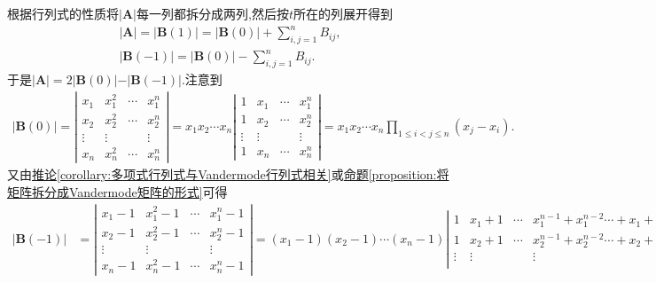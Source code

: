 \documentclass[../../main.tex]{subfiles}
\begin{document}
\begin{solution}
根据行列式的性质将\(\vert\boldsymbol{A}\vert\)每一列都拆分成两列,然后按\(t\)所在的列展开得到
\begin{gather*}
\vert\boldsymbol{A}\vert=\vert\boldsymbol{B}(1)\vert=\vert\boldsymbol{B}(0)\vert+\sum_{i,j = 1}^{n}B_{ij},
\\
\vert\boldsymbol{B}(-1)\vert=\vert\boldsymbol{B}(0)\vert-\sum_{i,j = 1}^{n}B_{ij}.
\end{gather*}
于是\(\vert\boldsymbol{A}\vert = 2\vert\boldsymbol{B}(0)\vert - \vert\boldsymbol{B}(-1)\vert\).注意到
\begin{align*}
\vert\boldsymbol{B}(0)\vert=\left|\begin{matrix}
x_1 & x_{1}^{2} & \cdots & x_{1}^{n}\\
x_2 & x_{2}^{2} & \cdots & x_{2}^{n}\\
\vdots & \vdots &  & \vdots\\
x_n & x_{n}^{2} & \cdots & x_{n}^{n}
\end{matrix}\right|=x_1x_2\cdots x_n\left|\begin{matrix}
1 & x_1 & \cdots & x_{1}^{n}\\
1 & x_2 & \cdots & x_{2}^{n}\\
\vdots & \vdots &  & \vdots\\
1 & x_n & \cdots & x_{n}^{n}
\end{matrix}\right|=x_1x_2\cdots x_n\prod_{1\leqslant i < j\leqslant n}(x_j - x_i). 
\end{align*}
又由\hyperref[corollary:多项式行列式与Vandermode行列式相关]{推论\ref{corollary:多项式行列式与Vandermode行列式相关}}或\hyperref[proposition:将矩阵拆分成Vandermode矩阵的形式]{命题\ref{proposition:将矩阵拆分成Vandermode矩阵的形式}}可得
\begin{align*}
\vert\boldsymbol{B}(-1)\vert&=\left|\begin{matrix}
x_1 - 1 & x_{1}^{2} - 1 & \cdots & x_{1}^{n} - 1\\
x_2 - 1 & x_{2}^{2} - 1 & \cdots & x_{2}^{n} - 1\\
\vdots & \vdots &  & \vdots\\
x_n - 1 & x_{n}^{2} - 1 & \cdots & x_{n}^{n} - 1
\end{matrix}\right|
=(x_1 - 1)(x_2 - 1)\cdots (x_n - 1)\left|\begin{matrix}
1 & x_1 + 1 & \cdots & x_{1}^{n - 1} + x_{1}^{n - 2}\cdots + x_1 + 1\\
1 & x_2 + 1 & \cdots & x_{2}^{n - 1} + x_{2}^{n - 2}\cdots + x_2 + 1\\
\vdots & \vdots &  & \vdots\\

\end{matrix}
\end{align*}
\end{solution}
\end{document}
